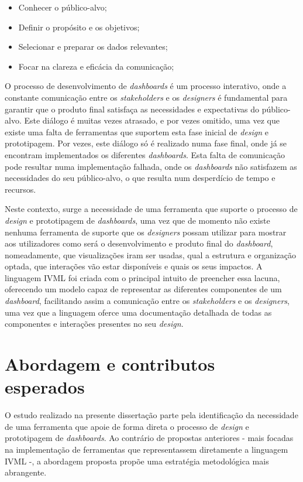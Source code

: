 \begin{itemize}
    \item Conhecer o público-alvo;
    \item Definir o propósito e os objetivos;
    \item Selecionar e preparar os dados relevantes;
    \item Focar na clareza e eficácia da comunicação;
\end{itemize}

O processo de desenvolvimento de \textit{dashboards} é um processo interativo, onde a constante comunicação entre os \textit{stakeholders} e os \textit{designers} é fundamental para garantir que o produto final satisfaça as necessidades e expectativas do público-alvo. Este diálogo é muitas vezes atrasado, e por vezes omitido, uma vez que existe uma falta de ferramentas que suportem esta fase inicial de \textit{design} e prototipagem. Por vezes, este diálogo só é realizado numa fase final, onde já se encontram implementados os diferentes \textit{dashboards}. Esta falta de comunicação pode resultar numa implementação falhada, onde os \textit{dashboards} não satisfazem as necessidades do seu público-alvo, o que resulta num desperdício de tempo e recursos.

Neste contexto, surge a necessidade de uma ferramenta que suporte o processo de \textit{design} e prototipagem de \textit{dashboards}, uma vez que de momento não existe nenhuma ferramenta de suporte que os \textit{designers} possam utilizar para mostrar aos utilizadores como será o desenvolvimento e produto final do \textit{dashboard}, nomeadamente, que visualizações iram ser usadas, qual a estrutura e organização optada, que interações vão estar disponíveis e quais os seus impactos. A linguagem \gls{IVML} foi criada com o principal intuito de preencher essa lacuna, oferecendo um modelo capaz de representar as diferentes componentes de um \textit{dashboard}, facilitando assim a comunicação entre os \textit{stakeholders} e os \textit{designers}, uma vez que a linguagem oferce uma documentação detalhada de todas as componentes e interações presentes no seu \textit{design}.

\section{Abordagem e contributos esperados}
\label{sec:contribuicoes}

O estudo realizado na presente dissertação parte pela identificação da necessidade de uma ferramenta que apoie de forma direta o processo de \textit{design} e prototipagem de \textit{dashboards}. Ao contrário de propostas anteriores - mais focadas na implementação de ferramentas que representassem diretamente a linguagem \gls{IVML} -, a abordagem proposta propõe uma estratégia metodológica mais abrangente.

